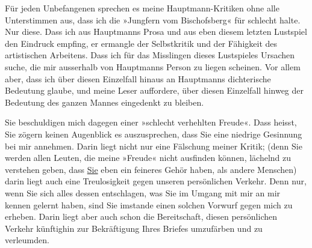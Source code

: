 \pstart
           Für jeden Unbefangenen sprechen es meine Hauptmann-Kritiken ohne alle
               Unterstimmen aus, dass ich die »Jungfern vom
                  Bischofsberg« für schlecht halte. Nur diese. Dass ich aus Hauptmanns Prosa und aus eben diesem letzten Lustspiel den Eindruck empfing, er ermangle
               der Selbstkritik und der Fähigkeit des artistischen Arbeitens. Dass ich für das
               Misslingen dieses Lustspieles
               Ursachen suche, die mir ausserhalb von Hauptmanns Person zu liegen scheinen. Vor allem aber, dass ich über diesen
               Einzelfall hinaus an Hauptmanns dichterische
               Bedeutung glaube, und meine Leser auffordere, über diesen Einzelfall hinweg der
               Bedeutung des ganzen Mannes
               eingedenkt zu bleiben.\pend
           
\pstart
           Sie beschuldigen mich dagegen einer »schlecht verhehlten Freude«. Dass heisst, Sie
               zögern keinen Augenblick es auszu{\pb}sprechen, dass Sie eine
               niedrige Gesinnung bei mir annehmen. Darin liegt nicht nur eine Fälschung meiner
               Kritik; (denn Sie werden allen Leuten, die meine »Freude« nicht ausfinden können,
               lächelnd zu verstehen geben, dass \uline{Sie} eben ein
               feineres Gehör haben, als andere Menschen) darin liegt auch eine Treulosigkeit gegen
               unseren persönlichen Verkehr. Denn nur, wenn Sie sich alles dessen entschlagen, was
               Sie im Umgang mit mir an mir kennen gelernt haben, sind Sie imstande einen solchen
               Vorwurf gegen mich zu erheben. Darin liegt aber auch schon die Bereitschaft, diesen
               persönlichen Verkehr künftighin zur Bekräftigung Ihres Briefes umzufärben und zu
               verleumden.\pend
           
